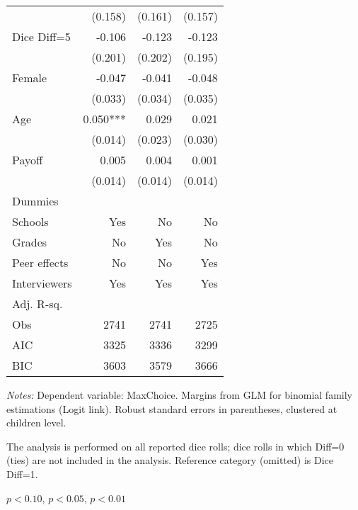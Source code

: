 \begin{table}[htbp]
\begin{threeparttable}
\begin{tabular}{l*{3}{D{.}{.}{-1}}}
                    &             (0.158)   &             (0.161)   &             (0.157)   \\
Dice Diff=5         &              -0.106   &              -0.123   &              -0.123   \\
                    &             (0.201)   &             (0.202)   &             (0.195)   \\
Female              &              -0.047   &              -0.041   &              -0.048   \\
                    &             (0.033)   &             (0.034)   &             (0.035)   \\
Age                 &               0.050***&               0.029   &               0.021   \\
                    &             (0.014)   &             (0.023)   &             (0.030)   \\
Payoff              &               0.005   &               0.004   &               0.001   \\
                    &             (0.014)   &             (0.014)   &             (0.014)   \\
Dummies &&& \\
Schools             &                 Yes   &                  No   &                  No   \\
Grades              &                  No   &                 Yes   &                  No   \\
Peer effects        &                  No   &                  No   &                 Yes   \\
Interviewers        &                 Yes   &                 Yes   &                 Yes   \\
\midrule
Adj. R-sq.          &                       &                       &                       \\
Obs                 &                2741   &                2741   &                2725   \\
AIC                 &                3325   &                3336   &                3299   \\
BIC                 &                3603   &                3579   &                3666   \\
\bottomrule
\end{tabular}
\begin{tablenotes}
\footnotesize
\textit{Notes:} Dependent variable: MaxChoice. Margins from GLM for binomial family estimations (Logit link). Robust standard errors in parentheses, clustered at children level. \\
\item The analysis is performed on all reported dice rolls; dice rolls in which Diff=0 (ties) are not included in the analysis. Reference category (omitted) is Dice Diff=1. \\
\item \sym{*} \(p<0.10\), \sym{**} \(p<0.05\), \sym{***} \(p<0.01\)
\end{tablenotes}
\end{threeparttable}
\label{tab:cheat_patternsTOT}
\end{table}
